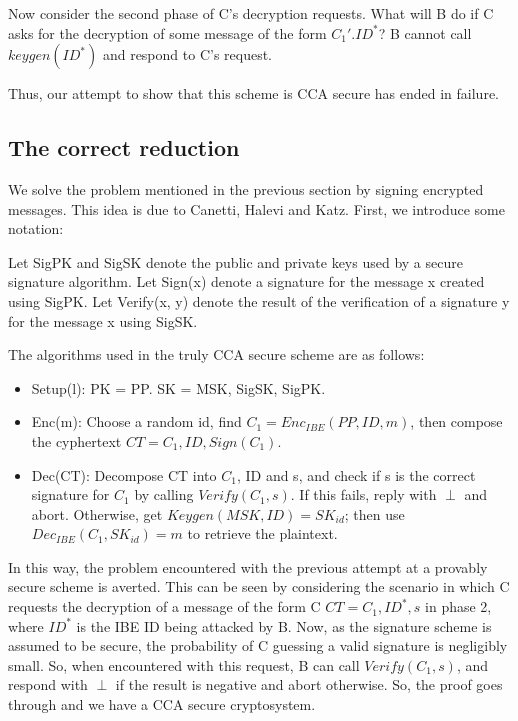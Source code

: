 \documentclass[11pt]{article}
\begin{document}
Now consider the second phase of C's decryption requests. What will B do if C asks for the decryption of some message of the form $C_{1}'.ID^{*}$? B cannot call $keygen(ID^{*})$ and respond to C's request.

Thus, our attempt to show that this scheme is CCA secure has ended in failure.

\subsection{The correct reduction}
We solve the problem mentioned in the previous section by signing encrypted messages. This idea is due to Canetti, Halevi and Katz. First, we introduce some notation:

Let SigPK and SigSK denote the public and private keys used by a secure signature algorithm. Let Sign(x) denote a signature for the message x created using SigPK. Let Verify(x, y) denote the result of the verification of a signature y for the message x using SigSK.

The algorithms used in the truly CCA secure scheme are as follows:

\begin{itemize}
 \item Setup(l): PK = PP. SK = MSK, SigSK, SigPK.
 \item Enc(m): Choose a random id, find $C_{1} = Enc_{IBE}(PP,ID,m)$, then compose the cyphertext $CT = C_{1}, ID, Sign(C_{1})$.
 \item Dec(CT): Decompose CT into $C_{1}$, ID and s, and check if s is the correct signature for $C_{1}$ by calling $Verify(C_{1}, s)$. If this fails, reply with $\perp$ and abort. Otherwise, get $Keygen(MSK, ID) = SK_{id}$; then use $Dec_{IBE}(C_{1}, SK_{id}) = m$ to retrieve the plaintext.
\end{itemize}

In this way, the problem encountered with the previous attempt at a provably secure scheme is averted. This can be seen by considering the scenario in which C requests the decryption of a message of the form C $CT = C_{1}, ID^{*}, s$ in phase 2, where $ID^{*}$ is the IBE ID being attacked by B. Now, as the signature scheme is assumed to be secure, the probability of C guessing a valid signature is negligibly small. So, when encountered with this request, B can call $Verify(C_{1}, s)$, and respond with $\perp$ if the result is negative and abort otherwise. So, the proof goes through and we have a CCA secure cryptosystem.
\end{document}
